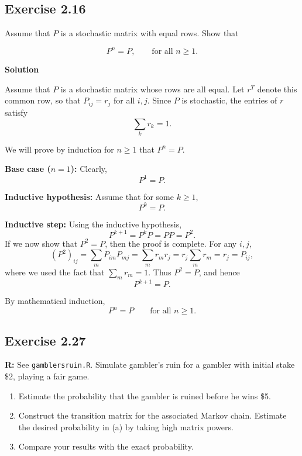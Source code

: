 \documentclass[hidelinks]{article}
\begin{document}
\subsection{Exercise 2.16} Assume that \(P\) is a stochastic matrix with equal rows.
Show that

\[
P^{n} = P,
\qquad \text{for all } n \ge 1.
\]


\noindent \textbf{Solution}

\smallskip

\noindent Assume that \(P\) is a stochastic matrix whose rows are all equal. Let
\(r^{T}\) denote this common row, so that \(P_{ij}=r_j\) for all \(i,j\).
Since \(P\) is stochastic, the entries of \(r\) satisfy
\[
\sum_{k} r_k = 1.
\]

\noindent We will prove by induction for \(n\ge 1\) that \(P^{n}=P\).

\medskip

\noindent \textbf{Base case (\(n=1\)):}
Clearly,
\[
P^{1}=P.
\]

\medskip

\noindent \textbf{Inductive hypothesis:}
Assume that for some \(k\ge 1\),
\[
P^{k}=P.
\]

\medskip

\noindent \textbf{Inductive step:}
Using the inductive hypothesis,
\[
P^{k+1}=P^{k}P=PP=P^{2}.
\]
If we  now show that \(P^{2}=P\), then the proof is complete. For any \(i,j\),
\[
(P^{2})_{ij}=\sum_{m} P_{im}P_{mj}
=\sum_{m} r_m r_j
=r_j \sum_{m} r_m
=r_j
=P_{ij},
\]
where we used the fact that \(\sum_{m} r_m=1\).
Thus \(P^{2}=P\), and hence
\[
P^{k+1}=P.
\]

\medskip

\noindent By mathematical induction,
\[
P^{n}=P \qquad \text{for all } n\ge 1.
\]

\subsection{Exercise 2.27}

\textbf{R:} See \texttt{gamblersruin.R}. Simulate gambler's ruin for a gambler
with initial stake \$2, playing a fair game.
\begin{enumerate}
  \item[(a)] Estimate the probability that the gambler is ruined before he wins \$5.
  \item[(b)] Construct the transition matrix for the associated Markov chain.
  Estimate the desired probability in (a) by taking high matrix powers.
  \item[(c)] Compare your results with the exact probability.
\end{enumerate}
\end{document}
